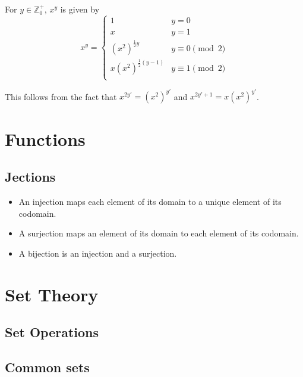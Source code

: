 \documentclass[fleqn,a4paper,11pt]{article}
\newcommand{\setstyle}{\mathbb}
\newcommand{\Integers}{\setstyle Z}
\begin{document}
    For \(y \in \Integers_0^+\), \(x^y\) is given by
    \begin{equation}
    x^y =
        \begin{cases}
        1 & y = 0 \\
        x & y = 1 \\
        (x ^ 2)^{\frac 12 y} & y \equiv 0 \pmod 2\\
        x(x ^ 2)^{\frac 12 (y-1)} & y \equiv 1 \pmod 2\\
        \end{cases}
    \end{equation}

    This follows from the fact that
    \(x^{2y'} = (x^2)^{y'}\) and \(x^{2y' + 1} = x(x^2)^{y'}\).

    \section{Functions}


    \subsection{Jections}


    \begin{itemize}
    \item An injection maps each element of its domain to a unique element of
          its codomain.
    \item A surjection maps an element of its domain to each element of its
          codomain.
    \item A bijection is an injection and a surjection.
    \end{itemize}

    \section{Set Theory}

    \subsection{Set Operations}

    \subsection{Common sets}
\end{document}
